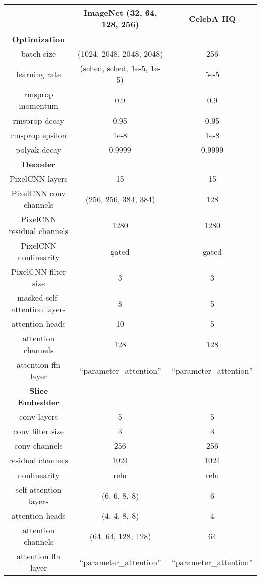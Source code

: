 \documentclass{article} \usepackage{iclr2019_conference,times}
\begin{document}
\begin{table}[t]
\label{table:hparam_table}
\begin{center}
\begin{tabular}{ccc}

& ImageNet (32, 64, 128, 256) & CelebA HQ \\
\hline
\hline
\bf{Optimization} & & \\
batch size & (1024, 2048, 2048, 2048) & 256 \\
learning rate & (sched, sched, 1e-5, 1e-5) & 5e-5 \\
rmsprop momentum & 0.9 & 0.9 \\
rmsprop decay & 0.95 & 0.95 \\
rmsprop epsilon & 1e-8 &  1e-8 \\
polyak decay & 0.9999 & 0.9999 \\

\hline
\hline
\bf{Decoder} & & \\
PixelCNN layers & 15 & 15 \\
PixelCNN conv channels & (256, 256, 384, 384) & 128 \\
PixelCNN residual channels & 1280 & 1280 \\
PixelCNN nonlinearity & gated & gated \\
PixelCNN filter size & 3 & 3 \\
masked self-attention layers & 8 & 5 \\
attention heads & 10 & 5 \\
attention channels & 128 & 128 \\
attention ffn layer & ``parameter\_attention'' & ``parameter\_attention'' \\

\hline
\hline
\bf{Slice Embedder} & & \\
conv layers & 5 & 5 \\
conv filter size & 3 & 3 \\
conv channels & 256 & 256 \\
residual channels & 1024 & 1024 \\
nonlinearity & relu & relu \\
self-attention layers & (6, 6, 8, 8) & 6 \\
attention heads & (4, 4, 8, 8) & 4 \\
attention channels & (64, 64, 128, 128) & 64 \\
attention ffn layer & ``parameter\_attention'' & ``parameter\_attention'' \\


\end{tabular}
\end{center}
\end{table}
\end{document}
